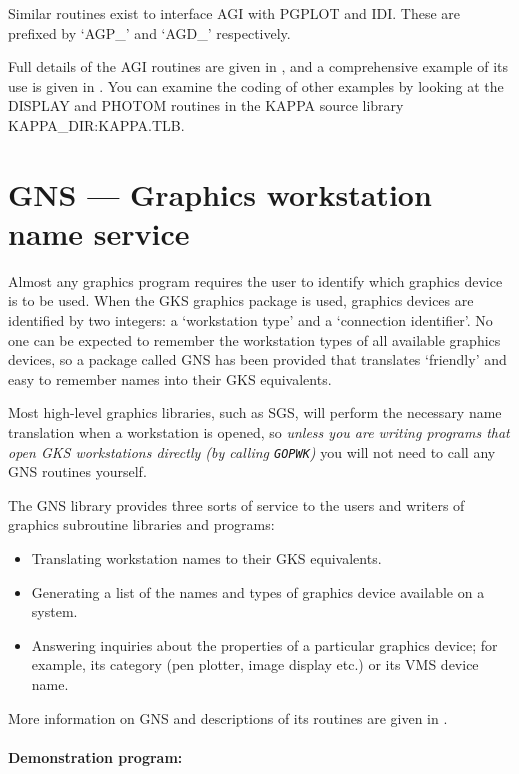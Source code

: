 Similar routines exist to interface AGI with PGPLOT and IDI.
These are prefixed by `AGP\_' and `AGD\_' respectively.

Full details of the AGI routines are given in , and a
comprehensive example of its use is given in .
You can examine the coding of other examples by looking at the DISPLAY and
PHOTOM routines in the KAPPA source library KAPPA\_DIR:KAPPA.TLB.

\section{GNS --- Graphics workstation name service}

Almost any graphics program requires the user to identify which graphics
device is to be used.
When the GKS graphics package is used, graphics devices are identified by two
integers: a `workstation type' and a `connection identifier'.
No one can be expected to remember the workstation types of all available
graphics devices, so a package called GNS has been provided that translates
`friendly' and easy to remember names into their GKS equivalents.

Most high-level graphics libraries, such as SGS, will perform the necessary name
translation when a workstation is opened, so {\em unless you are writing
programs that open GKS workstations directly (by calling {\tt GOPWK})} you will
not need to call any GNS routines yourself.

The GNS library provides three sorts of service to the users and writers of
graphics subroutine libraries and programs:

\begin{itemize}
\item Translating workstation names to their GKS equivalents.
\item Generating a list of the names and types of graphics device available on
 a system.
\item Answering inquiries about the properties of a particular graphics device;
 for example, its category (pen plotter, image display etc.) or its VMS device
 name.
\end{itemize}
More information on GNS and descriptions of its routines are given in
.

\paragraph{Demonstration program:}\hfill
{}

